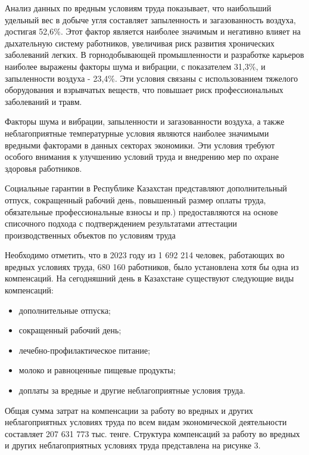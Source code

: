 \begin{multicols}{2}
Анализ данных по вредным условиям труда показывает, что наибольший
удельный вес в добыче угля составляет запыленность и загазованность
воздуха, достигая 52,6\%. Этот фактор является наиболее значимым и
негативно влияет на дыхательную систему работников, увеличивая риск
развития хронических заболеваний легких. В горнодобывающей
промышленности и разработке карьеров наиболее выражены факторы шума и
вибрации, с показателем 31,3\%, и запыленности воздуха - 23,4\%. Эти
условия связаны с использованием тяжелого оборудования и взрывчатых
веществ, что повышает риск профессиональных заболеваний и травм.

Факторы шума и вибрации, запыленности и загазованности воздуха, а также
неблагоприятные температурные условия являются наиболее значимыми
вредными факторами в данных секторах экономики. Эти условия требуют
особого внимания к улучшению условий труда и внедрению мер по охране
здоровья работников.

Социальные гарантии в Республике Казахстан представляют дополнительный
отпуск, сокращенный рабочий день, повышенный размер оплаты труда,
обязательные профессиональные взносы и пр.) предоставляются на основе
списочного подхода с подтверждением результатами аттестации
производственных объектов по условиям труда

Необходимо отметить, что в 2023 году из 1 692 214 человек, работающих во
вредных условиях труда, 680 160 работников, было установлена хотя бы
одна из компенсаций. На сегодняшний день в Казахстане существуют
следующие виды компенсаций:

\begin{itemize}
\item
  дополнительные отпуска;
\item
  сокращенный рабочий день;
\item
  лечебно-профилактическое питание;
\item
  молоко и равноценные пищевые продукты;
\item
  доплаты за вредные и другие неблагоприятные условия труда.
\end{itemize}

Общая сумма затрат на компенсации за работу во вредных и других
неблагоприятных условиях труда по всем видам экономической деятельности
составляет 207 631 773 тыс. тенге. Структура компенсаций за работу во
вредных и других неблагоприятных условиях труда представлена на рисунке
3.
\end{multicols}

